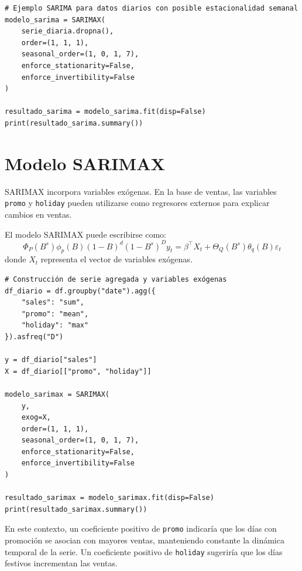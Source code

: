 \documentclass[12pt,a4paper]{article}
\begin{document}
\begin{lstlisting}[style=pythonstyle]
# Ejemplo SARIMA para datos diarios con posible estacionalidad semanal
modelo_sarima = SARIMAX(
    serie_diaria.dropna(),
    order=(1, 1, 1),
    seasonal_order=(1, 0, 1, 7),
    enforce_stationarity=False,
    enforce_invertibility=False
)

resultado_sarima = modelo_sarima.fit(disp=False)
print(resultado_sarima.summary())
\end{lstlisting}

\section{Modelo SARIMAX}

\begin{markdowncell}
SARIMAX incorpora variables exógenas. En la base de ventas, las variables \texttt{promo} y \texttt{holiday} pueden utilizarse como regresores externos para explicar cambios en ventas.
\end{markdowncell}

\begin{latexcell}
El modelo SARIMAX puede escribirse como:
\[
\Phi_P(B^s)\phi_p(B)(1-B)^d(1-B^s)^D y_t =
\beta^\top X_t + \Theta_Q(B^s)\theta_q(B)\varepsilon_t
\]
donde \(X_t\) representa el vector de variables exógenas.
\end{latexcell}

\begin{lstlisting}[style=pythonstyle]
# Construcción de serie agregada y variables exógenas
df_diario = df.groupby("date").agg({
    "sales": "sum",
    "promo": "mean",
    "holiday": "max"
}).asfreq("D")

y = df_diario["sales"]
X = df_diario[["promo", "holiday"]]

modelo_sarimax = SARIMAX(
    y,
    exog=X,
    order=(1, 1, 1),
    seasonal_order=(1, 0, 1, 7),
    enforce_stationarity=False,
    enforce_invertibility=False
)

resultado_sarimax = modelo_sarimax.fit(disp=False)
print(resultado_sarimax.summary())
\end{lstlisting}

\begin{interpretacion}
En este contexto, un coeficiente positivo de \texttt{promo} indicaría que los días con promoción se asocian con mayores ventas, manteniendo constante la dinámica temporal de la serie. Un coeficiente positivo de \texttt{holiday} sugeriría que los días festivos incrementan las ventas.
\end{interpretacion}
\end{document}
